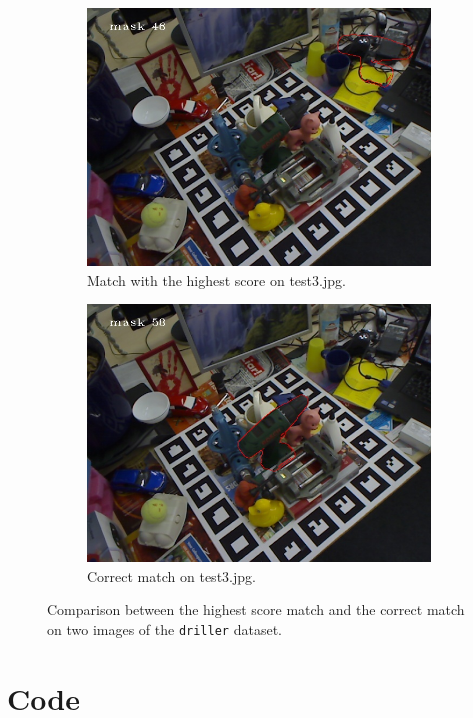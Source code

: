 \documentclass{article}
\begin{document}
\begin{figure}[H]
\begin{subfigure}{.5\textwidth}
  \includegraphics[width=.9\linewidth]{Images/driller_score3.jpg}  
  \caption{Match with the highest score on test3.jpg.}
\end{subfigure}
\begin{subfigure}{.5\textwidth}
  \centering
  \includegraphics[width=.9\linewidth]{Images/driller_best3.jpg}  
  \caption{Correct match on test3.jpg.}
\end{subfigure}
\caption{Comparison between the highest score match and the correct match on two images of the \texttt{driller} dataset.}
\label{example_matching}
\end{figure}

\section{Code}
\end{document}

